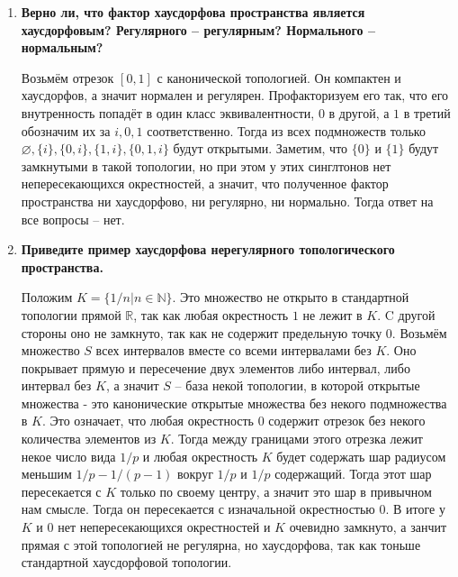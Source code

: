 \documentclass{article}
\begin{document}
\begin{enumerate}
    \item \textbf{Верно ли, что фактор хаусдорфова пространства является
        хаусдорфовым? Регулярного – регулярным? Нормального – нормальным?}\par
        Возьмём отрезок $[0,1]$ с канонической топологией. Он компактен и
        хаусдорфов, а значит нормален и регулярен. Профакторизуем его так, что
        его внутренность попадёт в один класс эквивалентности, $0$ в другой,
        а $1$ в третий обозначим их за $i,0,1$ соответственно. Тогда из всех
        подмножеств только $\varnothing, \{i\},\{0, i\},\{1,i\},\{0,1,i\}$
        будут открытыми. Заметим, что  $\{0\}$ и $\{1\}$ будут замкнутыми в
        такой топологии, но при этом у этих синглтонов нет непересекающихся
        окрестностей, а значит, что полученное фактор пространства ни
        хаусдорфово, ни регулярно, ни нормально. Тогда ответ на все вопросы – нет.

    \item \textbf{Приведите пример хаусдорфова нерегулярного топологического
        пространства.}\par
        Положим $K=\{1/n|n\in\mathbb{N}\}$. Это множество не открыто в
        стандартной топологии прямой $\mathbb{R}$, так как любая окрестность
        $1$ не лежит в $K$. C другой стороны оно не замкнуто, так как не
        содержит предельную точку $0$. Возьмём множество $S$ всех
        интервалов вместе со всеми интервалами без $K$. Оно покрывает прямую и
        пересечение двух элементов либо интервал, либо интервал без $K$, а
        значит $S$ – база некой топологии, в которой открытые множества - это
        канонические открытые множества без некого подмножества в $K$. Это
        означает, что любая окрестность $0$ содержит отрезок без некого
        количества элементов из $K$. Тогда между границами этого отрезка лежит
        некое число вида $1/p$ и любая окрестность $K$ будет содержать шар
        радиусом меньшим $1/p-1/(p-1)$ вокруг $1/p$ и $1/p$ содержащий. Тогда
        этот шар пересекается с $K$ только по своему центру, а значит это
        шар в привычном нам смысле. Тогда он пересекается с изначальной
        окрестностью $0$. В итоге у $K$ и $0$ нет непересекающихся окрестностей
        и $K$ очевидно замкнуто, а занчит прямая с этой топологией не регулярна,
        но хаусдорфова, так как тоньше стандартной хаусдорфовой топологии.


\end{enumerate}
\end{document}
